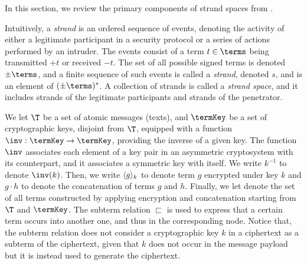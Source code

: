 In this section, we review the primary components of strand spaces from \cite{FHG98}.

 Intuitively, a \emph{strand} is an ordered sequence of events, denoting the activity of either a legitimate participant in a security protocol or a series of actions performed by an intruder.
 The events consist of a term $t \in \terms$ being
 transmitted $+t$  or received $-t$.
 The set of all possible signed terms is denoted $\pm \terms$, and a finite sequence of such events is called a {\em strand}, denoted $s$, and is an element of $(\pm \terms)^*$.
 A collection of strands is called a \emph{strand space}, and it includes strands of the legitimate participants and strands of the penetrator.


We let $\T$ be a set of atomic messages (texts), and $\termKey$ be a set of cryptographic keys, disjoint from $\T$, equipped with a function $\inv: \termKey \rightarrow \termKey$, providing the inverse of a given key. The function $\inv$ associates each element of a key pair in an asymmetric cryptosystem with its counterpart, and it associates a symmetric key with itself. We write $k^{-1}$ to denote $\inv(k)$. Then, we write ${\langle g \rangle _{k}}$ to denote term $g$ encrypted under key $k$ and  $g \cdot h$ to denote the concatenation of terms $g$ and $h$.
Finally, we let \terms denote the set of all terms constructed by applying encryption and concatenation starting from $\T$ and $\termKey$. The subterm relation $\sqsubset$ is used to express that a certain term occurs into another one, and thus in the corresponding node.
Notice that, the subterm relation does not consider a cryptographic key $k$ in a ciphertext  as a subterm of the ciphertext, given that $k$ does not occur in the message payload but it is instead used to generate the ciphertext.

